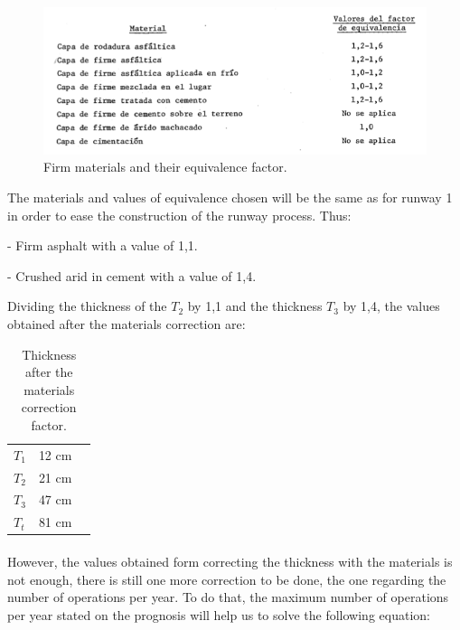 		\begin{figure}[H]
			\centering
			\includegraphics[clip, trim=0cm 0cm 0cm 0cm, width=1\textwidth]{./images/pavement/firmes}
			\caption{Firm materials and their equivalence factor.}
			\label{} %
		\end{figure}
		
		The materials and values of equivalence chosen will be the same as for runway 1 in order to ease the construction of the runway process. Thus:
		
		- Firm asphalt with a value of 1,1.
		
		- Crushed arid in cement with a value of 1,4.
		
		Dividing the thickness of the \(T_2\) by 1,1 and the thickness \(T_3\) by 1,4, the values obtained after the materials correction are:
		
		\begin{table}[htb]
			\centering
			\begin{tabular}{ll p{5cm}}
				\midrule[2pt]
				\(T_1\)& 12 cm\\
				\(T_2\) & 21 cm\\
				\(T_3\)& 47 cm \\
				\(T_t\)& 81 cm\\
				\bottomrule[2pt]
			\end{tabular}
			\caption{Thickness after the materials correction factor.}
		\end{table}
		
		\paragraph{}
		
		However, the values obtained form correcting the thickness with the materials is not enough, there is still one more correction to be done, the one regarding the number of operations per year. To do that, the maximum number of operations per year stated on the prognosis will help us to solve the following equation:
		
